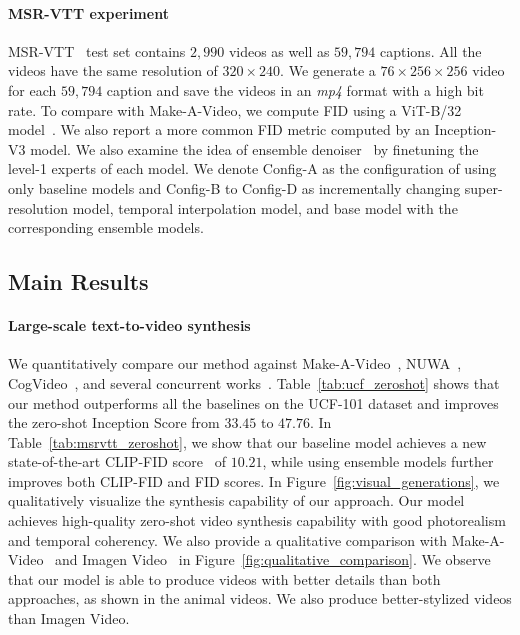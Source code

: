 \documentclass[10pt,twocolumn,letterpaper]{article}
\begin{document}
\paragraph{MSR-VTT experiment} MSR-VTT~\cite{xu2016msr} test set contains $2,990$ videos as well as $59,794$ captions. All the videos have the same resolution of $320\times240$. We generate a $76\times256\times256$ video for each $59,794$ caption and save the videos in an \textit{mp4} format with a high bit rate. To compare with Make-A-Video, we compute FID using a ViT-B/32 model~\cite{kynkaanniemi2023the}. We also report a more common FID metric computed by an Inception-V3 model. We also examine the idea of ensemble denoiser~\cite{balaji2022ediffi} by finetuning the level-1 experts of each model. We denote Config-A as the configuration of using only baseline models and Config-B to Config-D as incrementally changing super-resolution model, temporal interpolation model, and base model with the corresponding ensemble models.  


\subsection{Main Results}

\paragraph{Large-scale text-to-video synthesis}
We quantitatively compare our method against Make-A-Video~\cite{singer2022make}, NUWA~\cite{wu2022nuwa}, CogVideo~\cite{hong2022cogvideo}, and several concurrent works~\cite{blattmann2023videoldm,zhou2022magicvideo,blattmann2023videoldm,wang2023videofactory,an2023latent}. Table~\ref{tab:ucf_zeroshot} shows that our method outperforms all the baselines on the UCF-101 dataset and improves the zero-shot Inception Score from $33.45$ to $47.76$.
In Table~\ref{tab:msrvtt_zeroshot}, we show that our baseline model achieves a new state-of-the-art CLIP-FID score~\cite{kynkaanniemi2023the} of $10.21$, while using ensemble models further improves both CLIP-FID and FID scores.
In Figure~\ref{fig:visual_generations}, we qualitatively visualize the synthesis capability of our approach. Our model achieves high-quality zero-shot video synthesis capability with good photorealism and temporal coherency. We also provide a qualitative comparison with Make-A-Video~\cite{singer2022make} and Imagen Video~\cite{ho2022imagen} in Figure~\ref{fig:qualitative_comparison}. We observe that our model is able to produce videos with better details than both approaches, as shown in the animal videos. We also produce better-stylized videos than Imagen Video.
\end{document}
